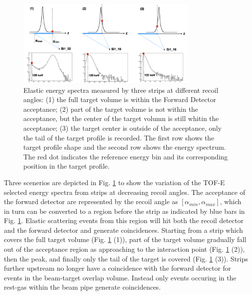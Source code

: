 \documentclass[fleqn,twocolumn,a4paper]{ikpar}
\begin{document}
\begin{figure}[b]
  \centering
	\includegraphics[width=0.8\textwidth]{./target_density_determination.png}
  \caption{Elastic energy spectra measured by three strips at different recoil
    angles: (1) the full target volume is within the Forward Detector acceptance; (2) part of the target volume is not within the
  acceptance, but the center of the target volumn is still whitin the
  acceptance; (3) the target center is outside of the acceptance, only the tail
  of the target profile is recorded. The first row shows the target profile
  shape and the second row shows the energy spectrum.
  The red dot indicates the reference energy bin and its corresponding position in the target profile.}
  \label{fig:target_density_determination}
\end{figure}

\par
\medskip

Three scenerios are depicted in Fig. \ref{fig:target_density_determination} to
show the variation of the TOF-E selected energy spectra from strips at decreasing recoil angles.
The acceptance of the forward detector are represented by the recoil angle as
$[\alpha_{min}, \alpha_{max}]$, which in turn can be converted to a region
before the strip as indicated by blue bars in Fig. \ref{fig:target_density_determination}.
Elastic scattering events from this region will hit both the recoil detector and the
forward detector and generate coincidences.
Starting from a strip which covers the full target volume (Fig.
\ref{fig:target_density_determination} (1)), part of the target volume gradually
fall out of the acceptance region as approaching to the interaction point (Fig.
\ref{fig:target_density_determination} (2)), then the peak, and finally only the
tail of the target is covered (Fig. \ref{fig:target_density_determination} (3)).
Strips further upstream no longer have a coincidence with the forward detector for events in the beam-target overlap volume.
Instead only events occuring in the rest-gas within the beam pipe generate coincidences.
\end{document}
